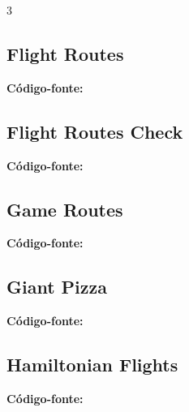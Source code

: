 \documentclass[8pt]{extarticle}
\begin{document}
\begin{multicols*}{3}
\subsection{Flight Routes}
\begin{caixaenunciado}

\end{caixaenunciado}
\vspace{0.3cm}
\noindent\textbf{Código-fonte:}


\subsection{Flight Routes Check}
\begin{caixaenunciado}

\end{caixaenunciado}
\vspace{0.3cm}
\noindent\textbf{Código-fonte:}


\subsection{Game Routes}
\begin{caixaenunciado}

\end{caixaenunciado}
\vspace{0.3cm}
\noindent\textbf{Código-fonte:}


\subsection{Giant Pizza}
\begin{caixaenunciado}

\end{caixaenunciado}
\vspace{0.3cm}
\noindent\textbf{Código-fonte:}


\subsection{Hamiltonian Flights}
\begin{caixaenunciado}

\end{caixaenunciado}
\vspace{0.3cm}
\noindent\textbf{Código-fonte:}



\end{multicols*}
\end{document}
